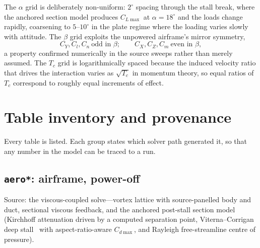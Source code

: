 \documentclass[11pt,a4paper]{article}
\newcommand{\varid}[1]{\texttt{\small #1}}
\newcommand{\dg}{^\circ}
\begin{document}
The $\alpha$ grid is deliberately non-uniform: $2\dg$ spacing through the
stall break, where the anchored section model produces $C_{L\max}$ at
$\alpha = 18\dg$ and the loads change rapidly, coarsening to $5$--$10\dg$
in the plate regime where the loading varies slowly with attitude. The
$\beta$ grid exploits the unpowered airframe's mirror symmetry,
\begin{equation}
C_Y, C_l, C_n \ \text{odd in } \beta; \qquad
C_X, C_Z, C_m \ \text{even in } \beta,
\label{eq:mirror}
\end{equation}
a property confirmed numerically in the source sweeps rather than merely
assumed. The $T_c$ grid is logarithmically spaced because the induced
velocity ratio that drives the interaction varies as $\sqrt{T_c}$ in
momentum theory, so equal ratios of $T_c$ correspond to roughly equal
increments of effect.

\section{Table inventory and provenance}
\label{sec:inventory}

Every table is listed. Each group states which solver path generated it,
so that any number in the model can be traced to a run.

\subsection{\varid{aero*}: airframe, power-off}
\label{sec:aerotables}

Source: the viscous-coupled solve---vortex lattice with source-panelled
body and duct, sectional viscous feedback, and the anchored post-stall
section model (Kirchhoff attenuation driven by a computed separation
point, Viterna--Corrigan deep stall~\cite{viterna} with
aspect-ratio-aware $C_{d\max}$, and Rayleigh free-streamline centre of
pressure).
\end{document}
